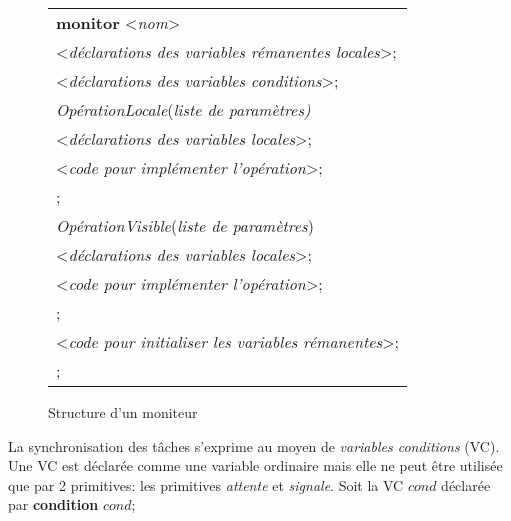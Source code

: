 \begin{figure}[!ht]

\centering
\begin{tabular}{l}
{\bf monitor} <{\em nom}> \\
\hspace{0.3cm}<{\em déclarations des variables rémanentes locales}>; \\
\hspace{0.3cm}<{\em déclarations des variables conditions}>;  \\
\hspace{0.3cm}{\bf procedure} {\em OpérationLocale}({\em liste de paramètres)}  \\
\hspace{0.6cm}<{\em déclarations des variables locales}>; \\
\hspace{0.6cm}{\bf begin} <{\em code pour implémenter l'opération}>; \\
\hspace{0.6cm}{\bf end}; \\
\hspace{0.3cm}{\bf entry procedure} {\em OpérationVisible}({\em liste de paramètres}) \\
\hspace{0.6cm}<{\em déclarations des variables locales}>; \\
\hspace{0.6cm}{\bf begin} <{\em code pour implémenter l'opération}>; \\
\hspace{0.6cm}{\bf end}; \\
\hspace{0.3cm}{\bf begin} <{\em code pour initialiser les variables rémanentes}>; \\
\hspace{0.3cm}{\bf end};
\end{tabular}
\caption{\label{moniteur:struct}Structure d'un moniteur}

\end{figure}

La synchronisation des tâches s'exprime au moyen de {\em variables conditions} (VC). Une VC est déclarée comme une variable ordinaire mais elle ne peut être utilisée que par 2 primitives: les primitives {\em attente} et {\em signale}. Soit la VC $cond$ déclarée par
\centering
{\bf condition} $cond$;

